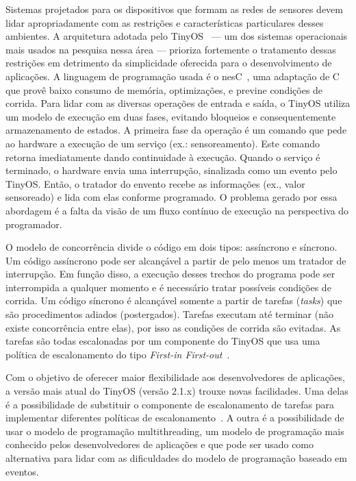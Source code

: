 \documentclass[a4paper, 10pt]{article}
\begin{document}
Sistemas projetados para os dispositivos que formam as redes de sensores devem lidar apropriadamente
com as restrições e características particulares desses ambientes. 
A arquitetura adotada pelo TinyOS~\cite{tinyos/00} --- um dos sistemas operacionais mais usados
na pesquisa nessa área --- prioriza fortemente o tratamento dessas restrições em 
detrimento da simplicidade oferecida para o desenvolvimento de aplicações. 
A linguagem de programação usada é o nesC~\cite{nesc/03}, uma adaptação de C que provê baixo 
consumo de memória, optimizações, e previne condições de corrida.
Para lidar com as diversas operações de entrada e saída, o TinyOS utiliza um modelo de 
execução em duas fases, evitando bloqueios e consequentemente armazenamento de estados. 
A primeira fase da operação é um comando que pede ao hardware a execução de um serviço 
(ex.: sensoreamento). Este comando retorna imediatamente dando continuidade à execução. Quando o
serviço é terminado, o hardware envia uma interrupção, sinalizada como um evento pelo TinyOS. 
Então, o tratador do envento recebe as informações (ex., valor sensoreado) e lida com elas conforme programado. 
O problema gerado por essa abordagem é a falta da visão de um fluxo contínuo de execução 
na perspectiva do programador. 

O modelo de concorrência divide o código em dois tipos: assíncrono e síncrono. 
Um código  assíncrono pode ser alcançável a partir de pelo menos
um tratador de interrupção. Em função disso, a execução desses trechos do programa pode ser interrompida
a qualquer momento e é necessário tratar possíveis condições de corrida.
Um código síncrono é alcançável somente a partir de tarefas (\textit{tasks}) que são 
procedimentos adiados (postergados). Tarefas executam até terminar (não existe concorrência entre elas), 
por isso as condições de corrida são evitadas.  
As tarefas são todas escalonadas por um componente do TinyOS que usa uma política de escalonamento 
do tipo \textit{First-in First-out}~\cite{LevisGay/09}.

Com o objetivo de oferecer maior flexibilidade aos desenvolvedores de aplicações, 
a versão mais atual do TinyOS (versão 2.1.x) trouxe novas facilidades.
Uma delas é a possibilidade de substituir o componente de escalonamento de tarefas
para implementar diferentes políticas de escalonamento~\cite{TEP106}.
A outra é a possibilidade de usar o modelo de programação multithreading,
um modelo de programação mais conhecido pelos desenvolvedores de aplicações e que pode
ser usado como alternativa para lidar com as dificuldades do modelo de programação baseado em eventos.
\end{document}
